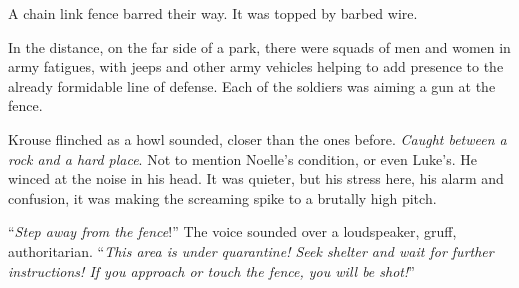 A chain link fence barred their way.  It was topped by barbed wire.



In the distance, on the far side of a park, there were squads of men and women in army fatigues, with jeeps and other army vehicles helping to add presence to the already formidable line of defense.  Each of the soldiers was aiming a gun at the fence.



Krouse flinched as a howl sounded, closer than the ones before.  \emph{Caught between a rock and a hard place}.  Not to mention Noelle's condition, or even Luke's.  He winced at the noise in his head.  It was quieter, but his stress here, his alarm and confusion, it was making the screaming spike to a brutally high pitch.



``\emph{Step away from the fence}!''  The voice sounded over a loudspeaker, gruff, authoritarian.  ``\emph{This area is under quarantine!  Seek shelter and wait for further instructions!  If you approach or touch the fence, you will be shot!}''





